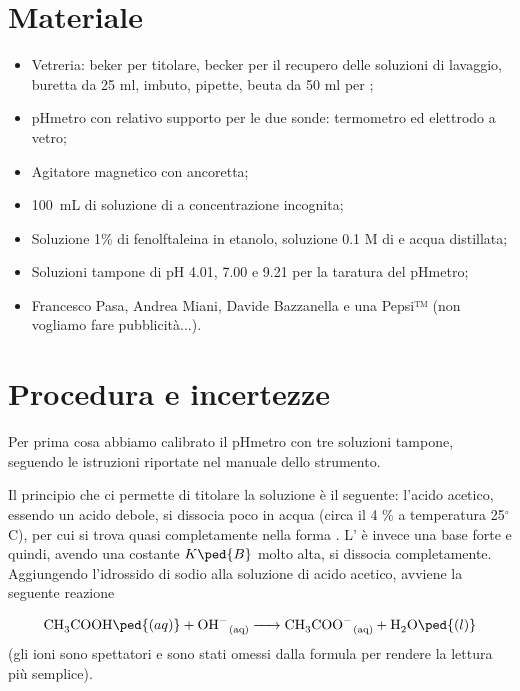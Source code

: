 \section*{Materiale}

\begin{itemize}
        \setlength{\parskip}{0pt}
        \item{Vetreria: beker per titolare, becker per il recupero delle soluzioni di lavaggio,
            buretta da 25 ml, imbuto, pipette, beuta da 50 ml per ;}
        \item{pHmetro con relativo supporto per le due sonde: termometro ed elettrodo a vetro;}
        \item{Agitatore magnetico con ancoretta;}
        \item{\SI{100}{\milli\liter} di soluzione di  a concentrazione incognita;}
        \item{Soluzione 1\% di fenolftaleina in etanolo, soluzione 0.1 M di  e acqua distillata;}
        \item{Soluzioni tampone di pH 4.01, 7.00 e 9.21 per la taratura del pHmetro;}
        \item{Francesco Pasa, Andrea Miani, Davide Bazzanella e una Pepsi™ (non vogliamo fare pubblicità...).}
\end{itemize}

\section*{Procedura e incertezze}

Per prima cosa abbiamo calibrato il pHmetro con tre soluzioni tampone,
seguendo le istruzioni riportate nel manuale dello strumento.

Il principio che ci permette di titolare la soluzione è il seguente: l'acido acetico, essendo un acido debole,
si dissocia poco in acqua (circa il 4 \% a temperatura 25$^\circ$C),
per cui si trova quasi completamente nella forma .
L' è invece una base forte e quindi, avendo una costante $K\ped{B}$ molto alta,
si dissocia completamente. Aggiungendo l'idrossido di sodio alla soluzione di acido acetico,
avviene la seguente reazione

\begin{equation}
    \ce{CH3COOH\ped{(aq)} + OH- _{(aq)} -> CH3COO- _{(aq)} + H2O\ped{(l)}}
    \label{eq:reaz}
\end{equation}
%
(gli ioni  sono spettatori e sono stati omessi dalla formula per rendere la lettura più semplice).

